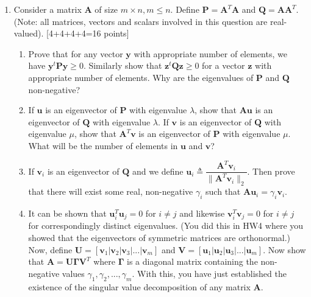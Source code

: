 \documentclass[11pt]{article}
\begin{document}
\begin{enumerate}
\begin{enumerate}
\item Consider a matrix $\boldsymbol{A}$ of size $m \times n, m \leq n$. Define $\boldsymbol{P} = \boldsymbol{A}^T \boldsymbol{A}$ and $\boldsymbol{Q} = \boldsymbol{A}\boldsymbol{A}^T$. (Note: all matrices, vectors and scalars involved in this question are real-valued). \textsf{[4+4+4+4=16 points]}
\begin{enumerate}
\item Prove that for any vector $\boldsymbol{y}$ with appropriate number of elements, we have $\boldsymbol{y}^t \boldsymbol{Py} \geq 0$. Similarly show that $\boldsymbol{z}^t \boldsymbol{Qz} \geq 0$ for a vector $\boldsymbol{z}$ with appropriate number of elements. Why are the eigenvalues of $\boldsymbol{P}$ and $\boldsymbol{Q}$ non-negative?
\item If $\boldsymbol{u}$ is an eigenvector of $\boldsymbol{P}$ with eigenvalue $\lambda$, show that $\boldsymbol{Au}$ is an eigenvector of $\boldsymbol{Q}$ with eigenvalue $\lambda$. If $\boldsymbol{v}$ is an eigenvector of $\boldsymbol{Q}$ with eigenvalue $\mu$, show that $\boldsymbol{A}^T\boldsymbol{v}$ is an eigenvector of $\boldsymbol{P}$ with eigenvalue $\mu$. What will be the number of elements in $\boldsymbol{u}$ and $\boldsymbol{v}$?

\item If $\boldsymbol{v}_i$ is an eigenvector of $\boldsymbol{Q}$ and we define $\boldsymbol{u}_i \triangleq \dfrac{\boldsymbol{A}^T \boldsymbol{v}_i}{\|\boldsymbol{A}^T \boldsymbol{v}_i\|_2}$. Then prove that there will exist some real, non-negative $\gamma_i$ such that $\boldsymbol{Au}_i = \gamma_i \boldsymbol{v}_i$.

\item It can be shown that $\boldsymbol{u}^T_i \boldsymbol{u}_j = 0$ for $i \neq j$ and likewise $\boldsymbol{v}^T_i \boldsymbol{v}_j = 0$ for $i \neq j$ for correspondingly distinct eigenvalues. (You did this in HW4 where you showed that the eigenvectors of symmetric matrices are orthonormal.) Now, define $\boldsymbol{U} = [\boldsymbol{v}_1 | \boldsymbol{v}_2 | \boldsymbol{v}_3 | ...|\boldsymbol{v}_m]$ and $\boldsymbol{V} = [\boldsymbol{u}_1 | \boldsymbol{u}_2 | \boldsymbol{u}_3 | ... |\boldsymbol{u}_m]$. Now show that $\boldsymbol{A} = \boldsymbol{U} \boldsymbol{\Gamma} \boldsymbol{V}^T$ where $\boldsymbol{\Gamma}$ is a diagonal matrix containing the non-negative values $\gamma_1, \gamma_2, ..., \gamma_m$. With this, you have just established the existence of the singular value decomposition of any matrix $\boldsymbol{A}$. 
\end{enumerate}
\end{enumerate}



\end{enumerate}
\end{document}
